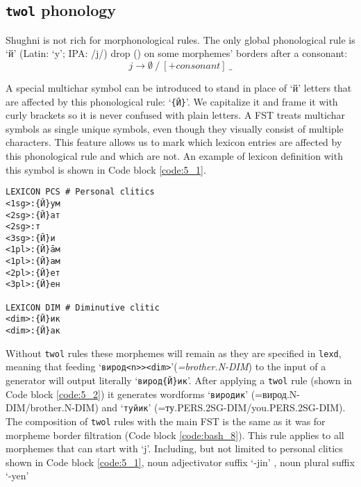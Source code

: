 \subsection{\texttt{twol} phonology}
Shughni is not rich for morphonological rules. The only global phonological rule is `й' (Latin: `y'; IPA: /j/) drop () on some morphemes' borders after a consonant:
\[
j \rightarrow \emptyset 
\ /\ 
[+consonant]
\ \_
\]

A special multichar symbol can be introduced to stand in place of `й' letters that are affected by this phonological rule: `\texttt{\{Й\}}'. We capitalize it and frame it with curly brackets so it is never confused with plain letters. A FST treats multichar symbols as single unique symbols, even though they visually consist of multiple characters. This feature allows us to mark which lexicon entries are affected by this phonological rule and which are not. An example of lexicon definition with this symbol is shown in Code block \ref{code:5_1}.

\begin{code_frame}[float]
    \begin{verbatim}
LEXICON PCS # Personal clitics
<1sg>:{Й}ум
<2sg>:{Й}ат
<2sg>:т
<3sg>:{Й}и
<1pl>:{Й}āм
<1pl>:{Й}ам
<2pl>:{Й}ет
<3pl>:{Й}ен

LEXICON DIM # Diminutive clitic
<dim>:{Й}ик
<dim>:{Й}ак
    \end{verbatim}
    \tcblower
    \label{code:5_1}
\end{code_frame}

Without \texttt{twol} rules these morphemes will remain as they are specified in \texttt{lexd}, meaning that feeding `\texttt{вирод<n>><dim>}'(\textit{=brother.N-DIM}) to the input of a generator will output literally `\texttt{вирод\{Й\}ик}'. After applying a \texttt{twol} rule (shown in Code block \ref{code:5_2}) it generates wordforms `\texttt{виродик}' (=вирод.N-DIM/brother.N-DIM) and `\texttt{туйик}' (=ту.PERS.2SG-DIM/you.PERS.2SG-DIM). The composition of \texttt{twol} rules with the main FST is the same as it was for morpheme border filtration (Code block \ref{code:bash_8}). This rule applies to all morphemes that can start with `j'. Including, but not limited to personal clitics shown in Code block \ref{code:5_1}, noun adjectivator suffix `-jin' \parencite[168]{parker_shughni_2023}, noun plural suffix `-yen'

